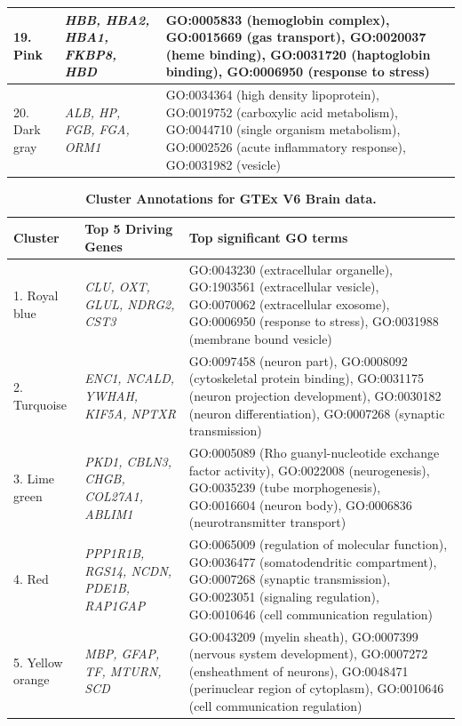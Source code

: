 \documentclass[10pt,letterpaper]{article}
\begin{document}
\begin{table}[!hp]
\begin{adjustwidth}{-2in}{0in}
\begin{tabular}{|p{1.0in}|p{1.5in}|p{4.3in}|}
19. Pink & \textit{HBB, HBA2, HBA1, FKBP8, HBD} & GO:0005833 (hemoglobin complex), GO:0015669 (gas transport), GO:0020037 (heme binding), GO:0031720 (haptoglobin binding), GO:0006950 (response to stress) \\ \hline
20. Dark gray  & \textit{ALB, HP, FGB, FGA, ORM1} & GO:0034364 (high density lipoprotein), GO:0019752 (carboxylic acid metabolism), GO:0044710 (single organism metabolism), GO:0002526 (acute inflammatory response), GO:0031982 (vesicle) \\ \hline
\end{tabular} \label{tab1}
\end{adjustwidth}
\end{table}



\begin{table}[!hp]
\begin{adjustwidth}{-2in}{0in} %
\footnotesize
\centering
\caption{\bf Cluster Annotations for GTEx V6 Brain data.}
\renewcommand{\arraystretch}{1.7}
\begin{tabular}{|p{1.0in}|p{1.5in}|p{4.3in}|}
 \hline
 Cluster & Top 5 Driving \qquad Genes  &  Top significant GO terms \\
\hline
 1. Royal blue &  \textit{CLU, OXT,  GLUL, NDRG2, CST3} & GO:0043230 (extracellular organelle), GO:1903561 (extracellular vesicle), GO:0070062 (extracellular exosome), GO:0006950 (response to stress), GO:0031988 (membrane bound vesicle) \\
 \hline
2. Turquoise & \textit{ENC1, NCALD, YWHAH, KIF5A, NPTXR} & GO:0097458 (neuron part), GO:0008092 (cytoskeletal protein binding), GO:0031175 (neuron projection development), GO:0030182 (neuron differentiation), GO:0007268 (synaptic transmission) \\
\hline
 3. Lime green & \textit{PKD1, CBLN3, CHGB, COL27A1, ABLIM1} & GO:0005089 (Rho guanyl-nucleotide exchange factor activity), GO:0022008 (neurogenesis), GO:0035239 (tube morphogenesis), GO:0016604 (neuron body), GO:0006836 (neurotransmitter transport) \\
\hline
4. Red & \textit{PPP1R1B, RGS14, NCDN, PDE1B, RAP1GAP} & GO:0065009 (regulation of molecular function), GO:0036477 (somatodendritic compartment), GO:0007268 (synaptic transmission), GO:0023051 (signaling regulation), GO:0010646 (cell communication regulation) \\
\hline
5. Yellow orange & \textit{MBP, GFAP, TF, MTURN, SCD} & GO:0043209 (myelin sheath), GO:0007399 (nervous system development), GO:0007272 (ensheathment of neurons), GO:0048471 (perinuclear region of cytoplasm), GO:0010646 (cell communication regulation)\\

\end{tabular}
\end{adjustwidth}
\end{table}
\end{document}

